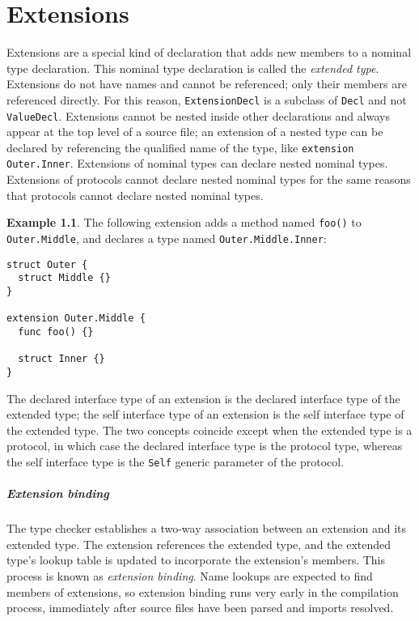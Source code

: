 \documentclass[a4paper,headsepline,bibliography=totoc,toc=flat,fleqn,twoside=semi]{scrbook}
\theoremstyle{definition}
\theoremstyle{definition}
\newtheorem{example}{Example}[chapter]
\theoremstyle{definition}
\newcommand{\ifWIP}{\iffalse}
\begin{document}
\chapter{Extensions}\label{extensions}

\ifWIP
Extensions are a special kind of declaration that adds new members to a nominal type declaration. This nominal type declaration is called the \emph{extended type}. Extensions do not have names and cannot be referenced; only their members are referenced directly. For this reason, \texttt{ExtensionDecl} is a subclass of \texttt{Decl} and not \texttt{ValueDecl}. Extensions cannot be nested inside other declarations and always appear at the top level of a source file; an extension of a nested type can be declared by referencing the qualified name of the type, like \texttt{extension Outer.Inner}. Extensions of nominal types can declare nested nominal types. Extensions of protocols cannot declare nested nominal types for the same reasons that protocols cannot declare nested nominal types. 

\begin{example} The following extension adds a method named \texttt{foo()} to \texttt{Outer.Middle}, and declares a type named \texttt{Outer.Middle.Inner}:
\begin{Verbatim}
struct Outer {
  struct Middle {}
}

extension Outer.Middle {
  func foo() {}

  struct Inner {}
}
\end{Verbatim}
\end{example}

The declared interface type of an extension is the declared interface type of the extended type; the self interface type of an extension is the self interface type of the extended type. The two concepts coincide except when the extended type is a protocol, in which case the declared interface type is the protocol type, whereas the self interface type is the \texttt{Self} generic parameter of the protocol.

\paragraph{Extension binding} The type checker establishes a two-way association between an extension and its extended type. The extension references the extended type, and the extended type's lookup table is updated to incorporate the extension's members. This process is known as \emph{extension binding}. Name lookups are expected to find members of extensions, so extension binding runs very early in the compilation process, immediately after source files have been parsed and imports resolved.
\end{document}
